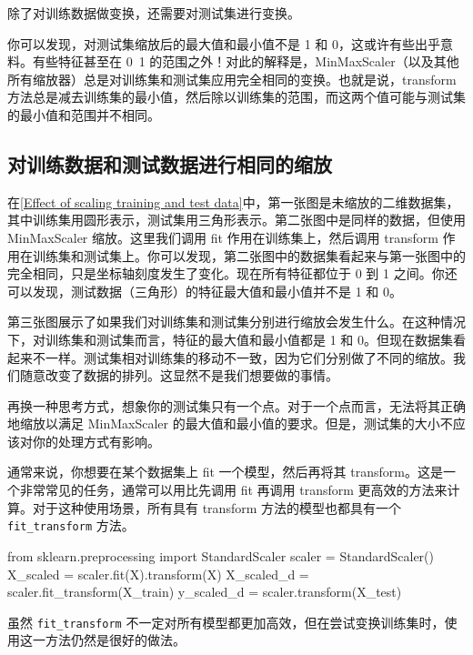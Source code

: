 除了对训练数据做变换，还需要对测试集进行变换。

你可以发现，对测试集缩放后的最大值和最小值不是 1 和 0，这或许有些出乎意料。有些特征甚至在 0~1 的范围之外！对此的解释是，MinMaxScaler（以及其他所有缩放器）总是对训练集和测试集应用完全相同的变换。也就是说，transform 方法总是减去训练集的最小值，然后除以训练集的范围，而这两个值可能与测试集的最小值和范围并不相同。
\subsection{对训练数据和测试数据进行相同的缩放}


在\autoref{Effect of scaling training and test data}中，第一张图是未缩放的二维数据集，其中训练集用圆形表示，测试集用三角形表示。第二张图中是同样的数据，但使用 MinMaxScaler 缩放。这里我们调用 fit 作用在训练集上，然后调用 transform 作用在训练集和测试集上。你可以发现，第二张图中的数据集看起来与第一张图中的完全相同，只是坐标轴刻度发生了变化。现在所有特征都位于 0 到 1 之间。你还可以发现，测试数据（三角形）的特征最大值和最小值并不是 1 和 0。

第三张图展示了如果我们对训练集和测试集分别进行缩放会发生什么。在这种情况下，对训练集和测试集而言，特征的最大值和最小值都是 1 和 0。但现在数据集看起来不一样。测试集相对训练集的移动不一致，因为它们分别做了不同的缩放。我们随意改变了数据的排列。这显然不是我们想要做的事情。

再换一种思考方式，想象你的测试集只有一个点。对于一个点而言，无法将其正确地缩放以满足 MinMaxScaler 的最大值和最小值的要求。但是，测试集的大小不应该对你的处理方式有影响。
\begin{tcolorbox}[title=快捷方式与高效的替代方法]
    通常来说，你想要在某个数据集上 fit 一个模型，然后再将其 transform。这是一个非常常见的任务，通常可以用比先调用 fit 再调用 transform 更高效的方法来计算。对于这种使用场景，所有具有 transform 方法的模型也都具有一个 \verb|fit_transform| 方法。
    \begin{pyc}
        from sklearn.preprocessing import StandardScaler
        scaler = StandardScaler()
        X_scaled = scaler.fit(X).transform(X)
        X_scaled_d = scaler.fit_transform(X_train)
        y_scaled_d = scaler.transform(X_test)
    \end{pyc}
    虽然 \verb|fit_transform| 不一定对所有模型都更加高效，但在尝试变换训练集时，使用这一方法仍然是很好的做法。
\end{tcolorbox}
